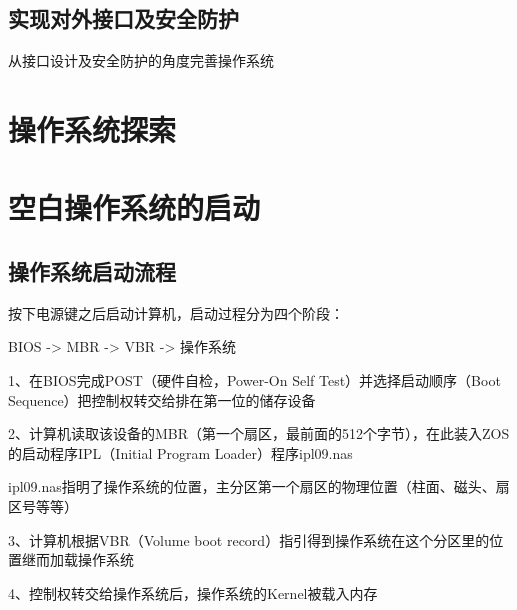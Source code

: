 \documentclass{swfcthesis}
\begin{document}
	\section{实现对外接口及安全防护}
	从接口设计及安全防护的角度完善操作系统
	
\chapter{操作系统探索}

\chapter{空白操作系统的启动}

	\section{操作系统启动流程}
	按下电源键之后启动计算机，启动过程分为四个阶段\cite{hbt}：
		\begin{center}BIOS -> MBR -> VBR -> 操作系统\end{center}
		
		1、在BIOS完成POST（硬件自检，Power-On Self Test）并选择启动顺序（Boot Sequence）把控制权转交给排在第一位的储存设备
		
		2、计算机读取该设备的MBR（第一个扇区，最前面的512个字节），在此装入ZOS的启动程序IPL（Initial Program Loader）程序ipl09.nas
		
		\hspace*{1cm}ipl09.nas指明了操作系统的位置，主分区第一个扇区的物理位置（柱面、磁头、扇区号等等）

		3、计算机根据VBR（Volume boot record）指引得到操作系统在这个分区里的位置继而加载操作系统
		
		4、控制权转交给操作系统后，操作系统的Kernel被载入内存
		
\end{document}
